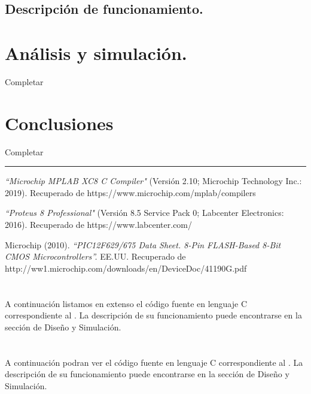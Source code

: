 \documentclass[a4paper]{article}
\let\originalappendix\appendix
\renewcommand{\appendix}{%
    \newpage\originalappendix\pagenumbering{gobble}%
    \renewcommand\thesection{Anexo \Alph{section}}
    \setcounter{secnumdepth}{1}
}
\begin{document}
\subsection{Descripción de funcionamiento.}

\section{Análisis y simulación.}

Completar

\section{Conclusiones}

Completar

\noindent\rule{\textwidth}{1pt}

\begin{thebibliography}{9}

\textit{``Microchip MPLAB XC8 C Compiler"}
(Versión 2.10; Microchip Technology Inc.: 2019).
Recuperado de https://www.microchip.com/mplab/compilers

\textit{``Proteus 8 Professional"} 
(Versión 8.5 Service Pack 0; Labcenter Electronics: 2016).
Recuperado de https://www.labcenter.com/

Microchip (2010).
\textit{``PIC12F629/675 Data Sheet. 8-Pin FLASH-Based 8-Bit CMOS 
Microcontrollers''.}
EE.UU. Recuperado de 
http://ww1.microchip.com/downloads/en/DeviceDoc/41190G.pdf

\end{thebibliography}


\appendix

\section{}
A continuación listamos en extenso el código fuente en lenguaje C
correspondiente al . La descripción de su 
funcionamiento puede encontrarse en la sección de Diseño y 
Simulación.

%

\newpage
\section{}
A continuación podran ver el  código fuente en lenguaje C correspondiente
al . La descripción de su funcionamiento puede encontrarse en
la sección de Diseño y Simulación.

%
\end{document}
